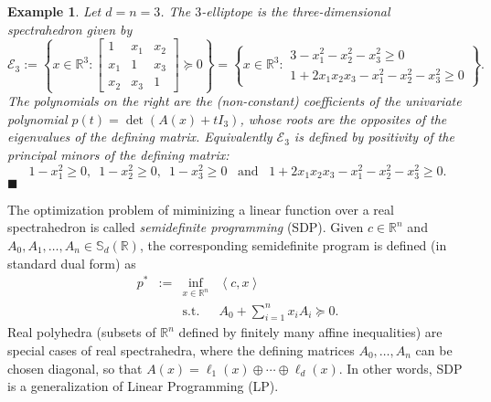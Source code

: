 \documentclass[a4paper,12pt]{article}
\newtheorem{example}[theorem]{Example}
\newcommand{\R}{\mathbb{R}} %
\newcommand{\sym}{\mathbb{S}} %
\newcommand{\exend}{\hfill $\blacksquare$}
\begin{document}
\begin{example}\label{ell3}
  Let $d=n=3$. The $3$-elliptope is the three-dimensional spectrahedron given by
  $$
  \mathcal{E}_3 :=
  \left\{
  x
  \in \R^3 :
  \begin{bmatrix}
    1 & x_1 & x_2 \\
    x_1 & 1 & x_3 \\
    x_2 & x_3 & 1
  \end{bmatrix}
  \succeq 0
  \right\}
  =
  \left\{
  x
  \in \R^3 :
  \begin{array}{r}
    3-x_1^2-x_2^2-x_3^2 \geq 0 \\
    1+2x_1x_2x_3-x_1^2-x_2^2-x_3^2 \geq 0
  \end{array}
  \right\}.
  $$
  The polynomials on the right are the (non-constant) coefficients of the univariate polynomial
  $p(t) = \det(A(x)+t I_3)$,
  whose roots are the opposites of the eigenvalues of the defining matrix. Equivalently $\mathcal{E}_3$
  is defined by positivity of the principal minors of the defining matrix:
  $$
  1-x_1^2 \geq 0, \,\,\, 1-x_2^2 \geq 0, \,\,\, 1-x_3^2 \geq 0 \,\,\, \text{ and } \,\,\, 1+2x_1x_2x_3-x_1^2-x_2^2-x_3^2 \geq 0.$$ \exend
\end{example}

The optimization problem of miminizing a linear function over a real spectrahedron is called \emph{semidefinite programming} (SDP). Given $c \in \R^n$ and $A_0,A_1,\ldots,A_n \in \sym_d(\R)$, the corresponding semidefinite program is defined (in standard dual form) as
\begin{equation}
  \label{SDP}
\begin{array}{rcll}
  p^* & := & \inf_{x \in \R^n} & \left\langle c, x \right\rangle \\
  &    & \text{s.t.}         & A_0+\sum_{i=1}^n x_i A_i \succeq 0.
\end{array}
\end{equation}
Real polyhedra (subsets of $\R^n$ defined by finitely many affine inequalities) are special cases of real
spectrahedra, where the defining matrices $A_0, \ldots, A_n$ can be chosen diagonal, so that $A(x) =
\ell_1(x) \oplus \cdots \oplus \ell_d(x)$. In other words, SDP is a generalization of Linear Programming (LP).

\end{document}
